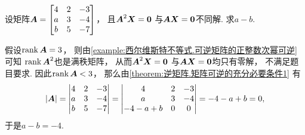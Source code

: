 \begin{example}
设矩阵\(\boldsymbol{A} = \begin{bmatrix}
	4 & 2 & -3 \\
	a & 3 & -4 \\
	b & 5 & -7
\end{bmatrix}\)，
且\(\boldsymbol{A}^2 \boldsymbol{X} = \boldsymbol0\)
与\(\boldsymbol{A} \boldsymbol{X} = \boldsymbol0\)不同解.
求\(a-b\).
\begin{solution}
假设\(\rank\boldsymbol{A} = 3\)，
则由\cref{example:西尔维斯特不等式.可逆矩阵的正整数次幂可逆} 可知
\(\rank\boldsymbol{A}^2\)也是满秩矩阵，
从而\(\boldsymbol{A}^2 \boldsymbol{X} = \boldsymbol0\)
与\(\boldsymbol{A} \boldsymbol{X} = \boldsymbol0\)均只有零解，
不满足题目要求.
因此\(\rank\boldsymbol{A} < 3\)，
那么由\cref{theorem:逆矩阵.矩阵可逆的充分必要条件1} 有\begin{equation*}
	\abs{\boldsymbol{A}}
	= \begin{vmatrix}
		4 & 2 & -3 \\
		a & 3 & -4 \\
		b & 5 & -7
	\end{vmatrix}
	= \begin{vmatrix}
		4 & 2 & -3 \\
		a & 3 & -4 \\
		-4-a+b & 0 & 0
	\end{vmatrix}
	= -4 - a + b
	= 0,
\end{equation*}
于是\(a-b=-4\).
\end{solution}
\end{example}
